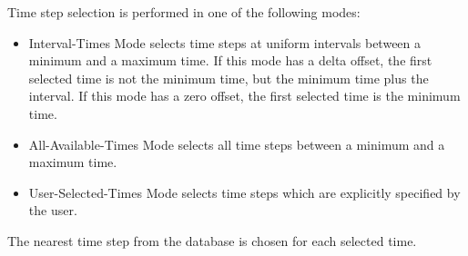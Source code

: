 Time step selection is performed in one of the following modes:
\setlength{\itemsep}{\bigskipamount} \begin{itemize}
\item
\ifx\PROGRAM\BLOT
{}
\else
Interval-Times Mode
\fi
selects time steps at uniform intervals between a minimum and a maximum
time. If this mode has a delta offset, the first selected time is not
the minimum time, but the minimum time plus the interval. If this mode
has a zero offset, the first selected time is the minimum time.
\item
\ifx\PROGRAM\BLOT
{}
\else
All-Available-Times Mode
\fi
selects all time steps between a minimum and a maximum time.
\item
\ifx\PROGRAM\BLOT
{}
\else
User-Selected-Times Mode
\fi
selects time steps which are explicitly specified by the user.
\end{itemize}

The nearest time step from the database is chosen for each selected
time.
